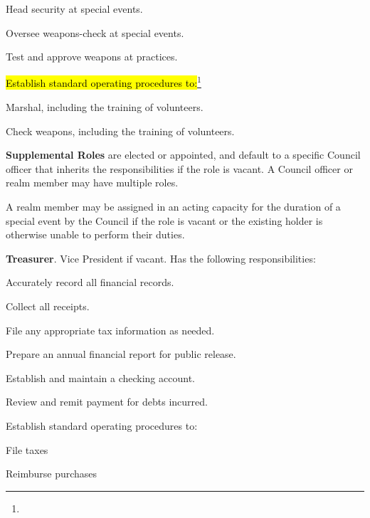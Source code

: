 \documentclass[12pt]{article}
\newcommand{\newpart}[2][]{\hl{#2}\expandafter\ifx\expandafter\relax\detokenize{#1}\relax\else\textnormal{\footnote{#1}}\fi}
\begin{document}
\begin{level}
\begin{level}
\begin{level}
            \item Head security at special events.
            \item Oversee weapons-check at special events.
            \item Test and approve weapons at practices.
            \item \newpart{Establish standard operating procedures to:}
            \begin{level}
                \item Marshal, including the training of volunteers.
                \item Check weapons, including the training of volunteers.
            \end{level}
        \end{level}
\end{level}
\item \textbf{Supplemental Roles} are elected or appointed, and default to a specific Council officer that inherits the responsibilities if the role is vacant. A Council officer or realm member may have multiple roles.\label{supplemental_roles}
\begin{level}
    \item A realm member may be assigned in an acting capacity for the duration of a special event by the Council if the role is vacant or the existing holder is otherwise unable to perform their duties.
    \item \textbf{Treasurer}. Vice President if vacant. Has the following responsibilities:
    \begin{level}
        \item Accurately record all financial records.
        \item Collect all receipts.
        \item File any appropriate tax information as needed.
        \item Prepare an annual financial report for public release.
        \item Establish and maintain a checking account.
        \item Review and remit payment for debts incurred.
        \item Establish standard operating procedures to:
        \begin{level}
            \item File taxes
            \item Reimburse purchases
        \end{level}
    \end{level}

\end{level}
\end{level}
\end{document}
